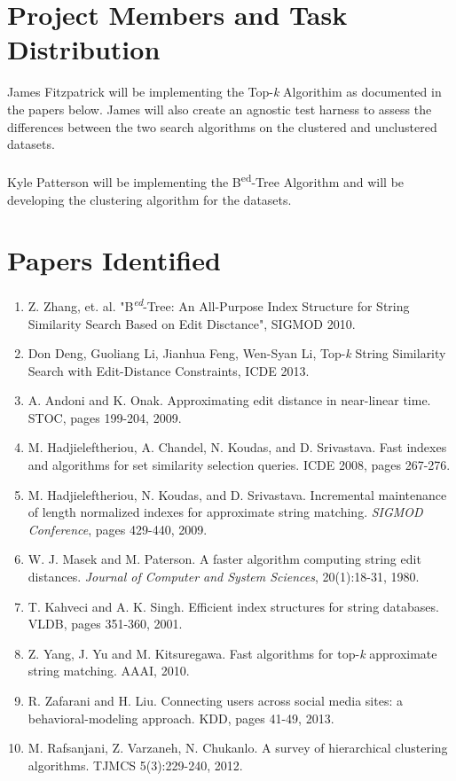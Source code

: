 \documentclass[pdftex,12pt,letter]{article}
\begin{document}
\section{Project Members and Task Distribution}
James Fitzpatrick will be implementing the Top-\textit{k}  Algorithim as documented in the papers below. James will also create an agnostic test harness to assess the differences between the two search algorithms on the clustered and unclustered datasets.
\\\\
Kyle Patterson will be implementing the B\textsuperscript{ed}-Tree Algorithm and will be developing the clustering algorithm for the datasets. 

\section{Papers Identified}
\begin{enumerate}
\item Z. Zhang, et. al. "B\textsuperscript{\textit{ed}}-Tree: An All-Purpose Index Structure for String Similarity Search Based on Edit Disctance", SIGMOD 2010.
\item Don Deng, Guoliang Li, Jianhua Feng, Wen-Syan Li, Top-\textit{k} String Similarity Search with Edit-Distance Constraints, ICDE 2013.
\item A. Andoni and K. Onak. Approximating edit distance in near-linear time. STOC, pages 199-204, 2009.
\item M. Hadjieleftheriou, A. Chandel, N. Koudas, and D. Srivastava. Fast indexes and algorithms for set similarity selection queries. ICDE 2008, pages 267-276.
\item M. Hadjieleftheriou, N. Koudas, and D. Srivastava. Incremental maintenance of length normalized indexes for approximate string matching. \textit{SIGMOD Conference}, pages 429-440, 2009.
\item W. J. Masek and M. Paterson. A faster algorithm computing string edit distances. \textit{Journal of Computer and System Sciences}, 20(1):18-31, 1980.
\item T. Kahveci and A. K. Singh. Efficient index structures for string databases. VLDB, pages 351-360, 2001.
\item Z. Yang, J. Yu and M. Kitsuregawa. Fast algorithms for top-\textit{k} approximate string matching. AAAI, 2010.
\item R. Zafarani and H. Liu. Connecting users across social media sites: a behavioral-modeling approach. KDD, pages 41-49, 2013.
\item M. Rafsanjani, Z. Varzaneh, N. Chukanlo. A survey of hierarchical clustering algorithms. TJMCS 5(3):229-240, 2012.

\end{enumerate}
\FloatBarrier
\end{document}
